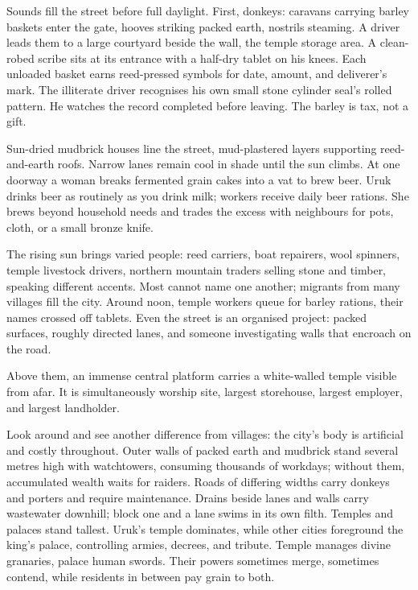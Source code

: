 Sounds fill the street before full daylight. First, donkeys: caravans carrying barley baskets enter the gate, hooves striking packed earth, nostrils steaming. A driver leads them to a large courtyard beside the wall, the temple storage area. A clean-robed scribe sits at its entrance with a half-dry tablet on his knees. Each unloaded basket earns reed-pressed symbols for date, amount, and deliverer's mark. The illiterate driver recognises his own small stone cylinder seal's rolled pattern. He watches the record completed before leaving. The barley is tax, not a gift.

Sun-dried mudbrick houses line the street, mud-plastered layers supporting reed-and-earth roofs. Narrow lanes remain cool in shade until the sun climbs. At one doorway a woman breaks fermented grain cakes into a vat to brew beer. Uruk drinks beer as routinely as you drink milk; workers receive daily beer rations. She brews beyond household needs and trades the excess with neighbours for pots, cloth, or a small bronze knife.

The rising sun brings varied people: reed carriers, boat repairers, wool spinners, temple livestock drivers, northern mountain traders selling stone and timber, speaking different accents. Most cannot name one another; migrants from many villages fill the city. Around noon, temple workers queue for barley rations, their names crossed off tablets. Even the street is an organised project: packed surfaces, roughly directed lanes, and someone investigating walls that encroach on the road.

Above them, an immense central platform carries a white-walled temple visible from afar. It is simultaneously worship site, largest storehouse, largest employer, and largest landholder.

Look around and see another difference from villages: the city's body is artificial and costly throughout. Outer walls of packed earth and mudbrick stand several metres high with watchtowers, consuming thousands of workdays; without them, accumulated wealth waits for raiders. Roads of differing widths carry donkeys and porters and require maintenance. Drains beside lanes and walls carry wastewater downhill; block one and a lane swims in its own filth. Temples and palaces stand tallest. Uruk's temple dominates, while other cities foreground the king's palace, controlling armies, decrees, and tribute. Temple manages divine granaries, palace human swords. Their powers sometimes merge, sometimes contend, while residents in between pay grain to both.

